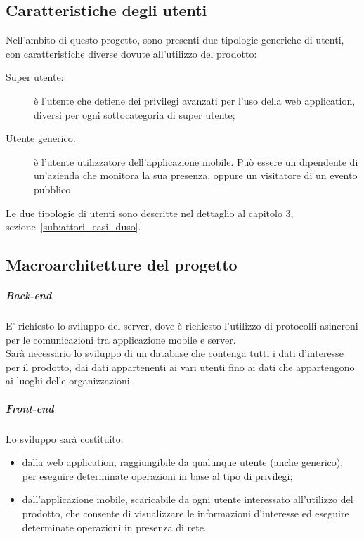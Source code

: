 \documentclass[../analisi-dei-requisiti.tex]{subfiles}
\begin{document}
\subsection{Caratteristiche degli utenti}%
\label{sub:caratteristiche_degli_utenti}
Nell'ambito di questo progetto, sono presenti due tipologie generiche di utenti, con caratteristiche diverse dovute all'utilizzo del prodotto:
\begin{description}
  \item[Super utente:] è l'utente che detiene dei privilegi avanzati per l'uso della web application, diversi per ogni sottocategoria di super utente;
  \item[Utente generico:] è l'utente utilizzatore dell'applicazione mobile. Può essere un dipendente di un'azienda che monitora la sua presenza, oppure
  un visitatore di un evento pubblico.
\end{description}
Le due tipologie di utenti sono descritte nel dettaglio al capitolo 3, sezione~\ref{sub:attori_casi_duso}.


\subsection{Macroarchitetture del progetto}%
\label{sub:macroarchitetture_del_progetto}
\subparagraph*{Back-end}%
\label{par:back-end}
E' richiesto lo sviluppo  del server, dove è richiesto l'utilizzo di protocolli asincroni per le comunicazioni tra applicazione mobile e server.\\
Sarà necessario lo sviluppo di un database che contenga tutti i dati d'interesse per il prodotto, dai dati appartenenti ai vari utenti fino ai dati che appartengono ai
luoghi delle organizzazioni.

\subparagraph*{Front-end}%
\label{par:front-end}
Lo sviluppo  sarà costituito:
\begin{itemize}
  \item dalla web application, raggiungibile da qualunque utente (anche generico), per eseguire determinate operazioni in base al tipo di privilegi;
  \item dall'applicazione mobile, scaricabile da ogni utente interessato all'utilizzo del prodotto, che consente di visualizzare le informazioni d'interesse ed eseguire determinate
  operazioni in presenza di rete.
\end{itemize}
\end{document}
